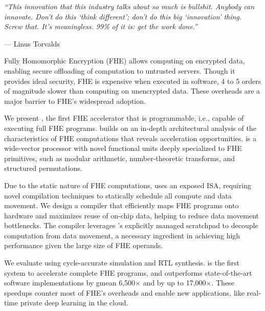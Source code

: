 
\emph{``This innovation that this industry talks about so much is bullshit. Anybody
can innovate. Don't do this `think different'; don't do this big `innovation'
thing. Screw that. It's meaningless. 99\% of it is: get the work done.''}

--- Linus Torvalds
\vspace{1cm}

Fully Homomorphic Encryption (FHE) allows computing on encrypted data, enabling secure offloading of computation to untrusted servers.
Though it provides ideal security, FHE is expensive when executed in software, 4 to 5 orders of magnitude slower than computing on unencrypted data.
These overheads are a major barrier to FHE's widespread adoption.

We present \name, the first FHE accelerator that is programmable, i.e., capable of executing full FHE programs.
\name builds on an in-depth architectural analysis of the characteristics of FHE computations
that reveals acceleration opportunities. \name is a wide-vector processor with novel functional units deeply specialized to FHE primitives, 
such as modular arithmetic, number-theoretic transforms, and structured permutations.

Due to the static nature of FHE computations, \name uses an exposed ISA, requiring novel compilation techniques to statically schedule all compute and data movement. We design a compiler that efficiently maps FHE programs onto \name hardware and maximizes reuse of on-chip data, helping to reduce data movement bottlenecks. 
The compiler leverages \name's explicitly managed scratchpad to decouple computation from data movement, a necessary ingredient in achieving high performance given the large size of FHE operands.

 
We evaluate \name using cycle-accurate simulation and RTL synthesis.
\name is the first system to accelerate complete FHE programs,
and outperforms state-of-the-art software implementations by gmean 6,500$\times$ and by up to 17,000$\times$.
These speedups counter most of FHE's overheads and enable new applications, like real-time private deep learning in the cloud.
